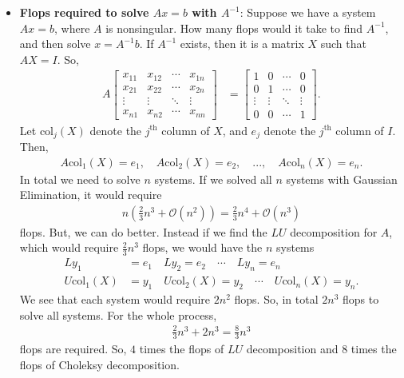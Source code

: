 \documentclass{report}
\begin{document}
\begin{itemize}
        \item \textbf{Flops required to solve $Ax =b$ with $A^{-1}$}: Suppose we have a system $Ax = b$, where $A$ is nonsingular. How many flops would it take to find $A^{-1}$, and then solve $x = A^{-1}b$.
            \bigbreak \noindent 
            If $A^{-1}$ exists, then it is a matrix $X$ such that $AX = I$. So, 
            \begin{align*}
                A\begin{bmatrix} x_{11} & x_{12} & \cdots & x_{1n} \\ x_{21} & x_{22} & \cdots & x_{2n} \\ \vdots & \vdots & \ddots & \vdots \\ x_{n1} & x_{n2} & \cdots & x_{nn} \end{bmatrix}
                &= \begin{bmatrix} 1 & 0 & \cdots & 0 \\ 0 & 1 & \cdots & 0 \\ \vdots & \vdots & \ddots & \vdots \\ 0 & 0 & \cdots & 1 \end{bmatrix}
            .\end{align*}
            Let $\text{col}_{j}(X)$ denote the $j^{\text{th}}$ column of $X$, and $e_{j}$ denote the $j^{\text{th}} $ column of $I$. Then,
            \begin{align*}
               A\text{col}_{1}(X) = e_{1}, \quad A\text{col}_{2}(X) = e_{2}, \quad ..., \quad A\text{col}_{n}(X) = e_{n} 
            .\end{align*}
            In total we need to solve $n$ systems. If we solved all $n$ systems with Gaussian Elimination, it would require
            \begin{align*}
                n\left(\frac{2}{3}n^{3} + \mathcal{O}(n^{2})\right) = \frac{2}{3}n^{4} + \mathcal{O}(n^{3})
            \end{align*}
            flops. But, we can do better. Instead if we find the $LU$ decomposition for $A$, which would require $\frac{2}{3}n^{3}$ flops, we would have the $n$ systems
            \begin{align*}
                Ly_{1} &= e_{1} \quad Ly_{2} = e_{2} \quad \cdots \quad Ly_{n} = e_{n}\\
                U\text{col}_{1}(X) &= y_{1} \quad U\text{col}_{2}(X) = y_{2} \quad \cdots \quad U\text{col}_{n}(X) = y_{n}
            .\end{align*}
            We see that each system would require $2n^{2}$ flops. So, in total $2n^{3}$ flops to solve all systems. For the whole process,
            \begin{align*}
                \frac{2}{3}n^{3} + 2n^{3} = \frac{8}{3}n^{3}
            \end{align*}
            flops are required. So, $4$ times the flops of $LU$ decomposition and $8$ times the flops of Choleksy decomposition. 
    \end{itemize}
\end{document}
